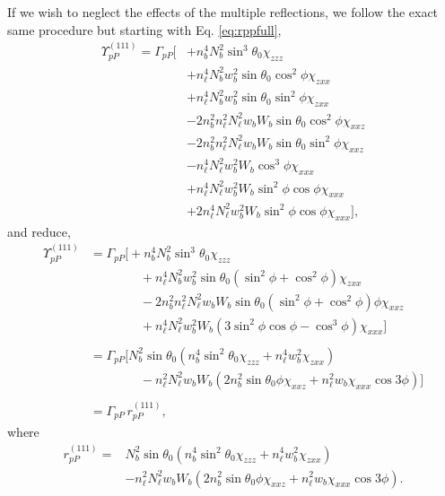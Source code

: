 If we wish to neglect the effects of the multiple reflections, we follow the
exact same procedure but starting with Eq. \eqref{eq:rppfull},
\begin{equation*}
\begin{split}
\Upsilon^{(111)}_{pP}
= \Gamma_{pP}
\big[
&+ n^{4}_{b}N^{2}_{b}\sin^{3}\theta_{0}\chi_{zzz}\\
&+ n^{4}_{\ell}N^{2}_{b}w^{2}_{b}\sin\theta_{0}\cos^{2}\phi\chi_{zxx}\\
&+ n^{4}_{\ell}N^{2}_{b}w^{2}_{b}\sin\theta_{0}\sin^{2}\phi\chi_{zxx}\\
&- 2n^{2}_{b}n^{2}_{\ell}N^{2}_{\ell}w_{b}W_{b}\sin\theta_{0}\cos^{2}\phi
  \chi_{xxz}\\
&- 2n^{2}_{b}n^{2}_{\ell}N^{2}_{\ell}w_{b}W_{b}\sin\theta_{0}\sin^{2}\phi
  \chi_{xxz}\\
&- n^{4}_{\ell}N^{2}_{\ell}w^{2}_{b}W_{b}\cos^{3}\phi\chi_{xxx}\\
&+ n^{4}_{\ell}N^{2}_{\ell}w^{2}_{b}W_{b}\sin^{2}\phi\cos\phi\chi_{xxx}\\
&+ 2n^{4}_{\ell}N^{2}_{\ell}w^{2}_{b}W_{b}\sin^{2}\phi\cos\phi\chi_{xxx}
\big],
\end{split}
\end{equation*}
and reduce,
\begin{equation*}
\begin{split}
\Upsilon^{(111)}_{pP} &=
\Gamma_{pP}
\big[
+ n^{4}_{b}N^{2}_{b}
   \sin^{3}\theta_{0}\chi_{zzz}\\
&\qquad\qquad+ n^{4}_{\ell}N^{2}_{b}w^{2}_{b}
   \sin\theta_{0}(\sin^{2}\phi + \cos^{2}\phi)\chi_{zxx}\\
&\qquad\qquad- 2n^{2}_{b}n^{2}_{\ell}N^{2}_{\ell}w_{b}W_{b}
   \sin\theta_{0}(\sin^{2}\phi + \cos^{2}\phi)\phi\chi_{xxz}\\
&\qquad\qquad+ n^{4}_{\ell}N^{2}_{\ell}w^{2}_{b}W_{b}
   (3\sin^{2}\phi\cos\phi - \cos^{3}\phi)\chi_{xxx}
\big]\\\\
&=
\Gamma_{pP}
\big[
N^{2}_{b}\sin\theta_{0}(n^{4}_{b}\sin^{2}\theta_{0}\chi_{zzz} 
+ n^{4}_{\ell}w^{2}_{b}\chi_{zxx})\\
&\qquad\qquad- n^{2}_{\ell}N^{2}_{\ell}w_{b}W_{b}(2n^{2}_{b}\sin\theta_{0}\phi
\chi_{xxz}
 + n^{2}_{\ell}w_{b}\chi_{xxx}\cos3\phi)
\big]\\\\
&= \Gamma_{pP}\,r^{(111)}_{pP},
\end{split}
\end{equation*}
where
\begin{equation}
\boxed{
\begin{split}
r^{(111)}_{pP} = 
&N^{2}_{b}\sin\theta_{0}(n^{4}_{b}\sin^{2}\theta_{0}\chi_{zzz} 
+ n^{4}_{\ell}w^{2}_{b}\chi_{zxx})\\
&- n^{2}_{\ell}N^{2}_{\ell}w_{b}W_{b}(2n^{2}_{b}\sin\theta_{0}\phi\chi_{xxz}
 + n^{2}_{\ell}w_{b}\chi_{xxx}\cos3\phi).
\end{split}
}
\end{equation}



